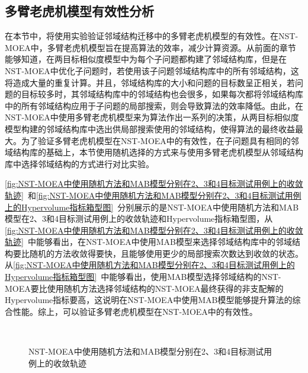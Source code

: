 \subsection{多臂老虎机模型有效性分析}
\label{subsec:NST:实验与讨论:多臂老虎机模型有效性分析}
在本节中，将使用实验验证邻域结构迁移中的多臂老虎机模型的有效性。在NST-MOEA中，多臂老虎机模型旨在提高算法的效率，减少计算资源。从前面的章节能够知道，在两目标相似度模型中为每个子问题都构建了邻域结构库，但是在NST-MOEA中优化子问题时，若使用该子问题邻域结构库中的所有邻域结构，这将造成大量的重复计算。并且，邻域结构库的大小和问题的目标数呈正相关，若问题的目标较多时，其邻域结构库中的邻域结构也会很多，如果每次都将邻域结构库中的所有邻域结构应用于子问题的局部搜索，则会导致算法的效率降低。由此，在NST-MOEA中使用多臂老虎机模型来为算法作出一系列的决策，从两目标相似度模型构建的邻域结构库中选出供局部搜索使用的邻域结构，使得算法的最终收益最大。为了验证多臂老虎机模型在NST-MOEA中的有效性，在子问题具有相同的邻域结构库的基础上，本节使用随机选择的方式来与使用多臂老虎机模型从邻域结构库中选择邻域结构的方式进行对比实验。
\par
\autoref{fig:NST-MOEA中使用随机方法和MAB模型分别在2、3和4目标测试用例上的收敛轨迹}~和\autoref{fig:NST-MOEA中使用随机方法和MAB模型分别在2、3和4目标测试用例上的Hypervolume指标箱型图}~分别展示的是NST-MOEA中使用随机方法和MAB模型在2、3和4目标测试用例上的收敛轨迹和Hypervolume指标箱型图，从\autoref{fig:NST-MOEA中使用随机方法和MAB模型分别在2、3和4目标测试用例上的收敛轨迹}~中能够看出，在NST-MOEA中使用MAB模型来选择邻域结构库中的邻域结构要比随机的方法收敛得要快，且能够使用更少的局部搜索次数达到收敛的状态。从\autoref{fig:NST-MOEA中使用随机方法和MAB模型分别在2、3和4目标测试用例上的Hypervolume指标箱型图}~中能够看出，使用MAB模型选择邻域结构的NST-MOEA要比使用随机方法选择邻域结构的NST-MOEA最终获得的非支配解的Hypervolume指标要高，这说明在NST-MOEA中使用MAB模型能够提升算法的综合性能。综上，可以验证多臂老虎机模型在NST-MOEA中的有效性。
\begin{figure}[!h]
     \quad
    \\
     \quad
    \caption[NST-MOEA中使用随机方法和MAB模型分别在2、3和4目标测试用例上的收敛轨迹]{NST-MOEA中使用随机方法和MAB模型分别在2、3和4目标测试用例上的收敛轨迹}
    \label{fig:NST-MOEA中使用随机方法和MAB模型分别在2、3和4目标测试用例上的收敛轨迹}
\end{figure}

